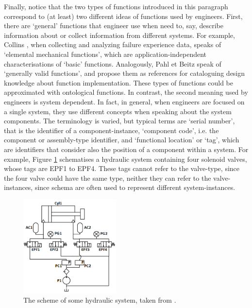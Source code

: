\documentclass[sw]{iosart2x}
\newcommand{\quotes}[1]{`#1'}
\begin{document}
Finally, notice that the two types of functions introduced in this paragraph correspond to (at least) two different ideas of functions used by engineers. 
First, there are \quotes{general} functions that engineer use when need to, say, describe information about or collect information from different systems. For example, Collins \cite{collinsFailureExperienceMatrixUseful1976}, when collecting and analyzing failure experience data, speaks of \quotes{elemental mechanical functions}, which are application-independent characterisations of \quotes{basic} functions. %
Analogously, Pahl et Beitz \cite{pahl_engineering_2007} speak of \quotes{generally valid functions}, and propose them as  references for cataloguing design knowledge about function implementation. These types of functions could be approximated with ontological functions.
In contrast, 
the second meaning used by engineers is system dependent. In fact, in general, when engineers are focused on a single system, they use different concepts when speaking about the system components. The terminology is varied, but typical terms are `serial number', that is the identifier of a component-instance, `component code', i.e. the component or assembly-type identifier, and `functional location' or `tag', which are identifiers that consider also the position of a component within a system. For example, Figure \ref{fig:hydroSystem} schematises a hydraulic system containing four solenoid valves, whose tags are EPF1 to EPF4. These tags cannot refer to the valve-type, since the four valve could have the same type, neither they can refer to the valve-instances, since schema are often used to represent different system-instances. 
\begin{figure}
  \centering
  \includegraphics[width=0.45\textwidth]{imamoTAXA.PNG}
  \caption{The scheme of some hydraulic system, taken from \cite{HydroPNG}.  \label{fig:hydroSystem}}
\end{figure}
\end{document}
